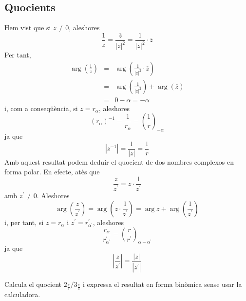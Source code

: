 \subsection{Quocients}

Hem vist que si $z\neq 0$, aleshores
\begin{equation*}
\frac{1}{z}=\frac{\overline{z}}{\left\vert z\right\vert ^{2}}=\frac{1}{
\left\vert z\right\vert ^{2}}\cdot \overline{z}
\end{equation*}
Per tant,
\begin{eqnarray*}
\arg \left( \frac{1}{z}\right) &=&\arg \left( \frac{1}{\left\vert
z\right\vert ^{2}}\cdot \overline{z}\right) \\
&=&\arg \left( \frac{1}{\left\vert z\right\vert ^{2}}\right) +\arg (
\overline{z}) \\
&=&0-\alpha =-\alpha
\end{eqnarray*}
i, com a conseqüència, si $z=r_{\alpha }$, aleshores
\begin{equation*}
\left( r_{\alpha }\right) ^{-1}=\frac{1}{r_{\alpha }}=\left( \frac{1}{r}
\right) _{-\alpha }
\end{equation*}
ja que
\begin{equation*}
\left\vert z^{-1}\right\vert =\frac{1}{\left\vert z\right\vert }=\frac{1}{r}
\end{equation*}
Amb aquest resultat podem deduir el quocient de dos nombres complexos
en forma polar. En efecte, atès que
\begin{equation*}
\frac{z}{z^{\prime }}=z\cdot \frac{1}{z^{\prime }}
\end{equation*}
amb $z^{\prime }\neq 0$. Aleshores
\begin{equation*}
\arg \left( \frac{z}{z^{\prime }}\right) =\arg \left( z\cdot \frac{1}{
z^{\prime }}\right) =\arg z+\arg \left( \frac{1}{z^{\prime }}\right)
\end{equation*}
i, per tant, si $z=r_{\alpha }$ i $z^{\prime }=r_{\alpha ^{\prime
}}^{\prime }$, aleshores
\begin{equation*}
\frac{r_{\alpha }}{r_{\alpha ^{\prime }}^{\prime }}=\left( \frac{r}{
r^{\prime }}\right) _{\alpha -\alpha ^{\prime }}
\end{equation*}
ja que
\begin{equation*}
\left\vert \frac{z}{z^{\prime }}\right\vert =\frac{\left\vert z\right\vert }{
\left\vert z^{\prime }\right\vert }
\end{equation*}

\begin{exemple}
Calcula el quocient $2_{\frac{\pi }{3}}/3_{\frac{\pi }{4}}$ i expressa el
resultat en forma binòmica sense usar la calculadora.
\end{exemple}

